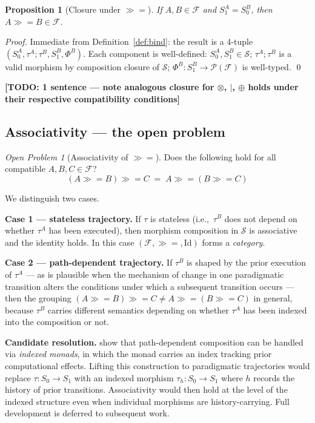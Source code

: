 \documentclass[11pt, a4paper]{article}
\theoremstyle{plain}
\newtheorem{proposition}[theorem]{Proposition}
\theoremstyle{definition}
\theoremstyle{remark}
\newtheorem{openproblem}{Open Problem}
\newcommand{\bind}{\mathbin{\gg\!=}}          %
\newcommand{\tensor}{\otimes}                  %
\newcommand{\pfork}{\mathbin{|}}               %
\newcommand{\merge}{\oplus}                    %
\newcommand{\nullfut}{\mathrm{Id}}             %
\newcommand{\Fut}{\mathcal{F}}                 %
\newcommand{\Pow}[1]{\mathcal{P}(#1)}         %
\newcommand{\States}{\mathcal{S}}              %
\newcommand{\Szero}{S_0}                       %
\newcommand{\Sone}{S_1}                        %
\newcommand{\traj}{\tau}                       %
\newcommand{\aff}{\Phi}                        %
\newcommand{\ie}{i.e.,\xspace}
\begin{document}
\begin{proposition}[Closure under $\bind$]
\label{prop:closure}
If $A, B \in \Fut$ and $\Sone^A = \Szero^B$, then $A \bind B \in \Fut$.
\end{proposition}

\begin{proof}
Immediate from Definition~\ref{def:bind}: the result is a 4-tuple
$(\Szero^A, \traj^A ; \traj^B, \Sone^B, \aff^B)$.
Each component is well-defined: $\Szero^A, \Sone^B \in \States$;
$\traj^A ; \traj^B$ is a valid morphism by composition closure of $\States$;
$\aff^B \colon \Sone^B \to \Pow{\Fut}$ is well-typed.
\qed
\end{proof}

\textbf{[TODO: 1 sentence — note analogous closure for $\tensor$, $\pfork$,
$\merge$ holds under their respective compatibility conditions]}

\subsection{Associativity — the open problem}

\begin{openproblem}[Associativity of $\bind$]
\label{op:assoc}
Does the following hold for all compatible $A, B, C \in \Fut$?
\[
  (A \bind B) \bind C \;=\; A \bind (B \bind C)
\]
\end{openproblem}

We distinguish two cases.

\medskip\noindent\textbf{Case 1 — stateless trajectory.}
If $\traj$ is stateless (\ie\ $\traj^B$ does not depend on whether $\traj^A$
has been executed), then morphism composition in $\States$ is associative
and the identity holds.
In this case $(\Fut, \bind, \nullfut)$ forms a \emph{category}.

\medskip\noindent\textbf{Case 2 — path-dependent trajectory.}
If $\traj^B$ is shaped by the prior execution of $\traj^A$ --- as is plausible
when the mechanism of change in one paradigmatic transition alters the
conditions under which a subsequent transition occurs --- then the grouping
$(A \bind B) \bind C \neq A \bind (B \bind C)$ in general, because
$\traj^B$ carries different semantics depending on whether $\traj^A$ has
been indexed into the composition or not.

\medskip\noindent\textbf{Candidate resolution.}
\textcite{orchard2014semantic} show that path-dependent composition can be
handled via \emph{indexed monads}, in which the monad carries an index
tracking prior computational effects.
Lifting this construction to paradigmatic trajectories would replace
$\traj\colon \Szero \to \Sone$ with an indexed morphism
$\traj_h\colon \Szero \to \Sone$ where $h$ records the history of prior
transitions.
Associativity would then hold at the level of the indexed structure even
when individual morphisms are history-carrying.
Full development is deferred to subsequent work.
\end{document}
